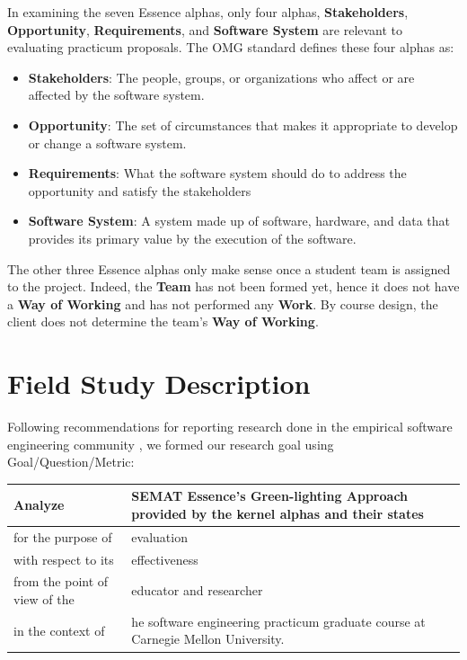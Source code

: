 \documentclass[conference]{IEEEtran}
\begin{document}
In examining the seven Essence alphas, only four alphas,
\textbf{Stakeholders}, \textbf{Opportunity}, \textbf{Requirements}, and \textbf{Software System} are relevant to evaluating practicum proposals. The OMG standard defines these four alphas as: \cite{OMGStandard}

\begin{itemize}
\itemsep1pt\parskip0pt
\item
  \textbf{Stakeholders}: The people, groups, or organizations who affect or
  are affected by the software system.
\item
  \textbf{Opportunity}: The set of circumstances that makes it appropriate to
  develop or change a software system.
\item
  \textbf{Requirements}: What the software system should do to address the
  opportunity and satisfy the stakeholders
\item
  \textbf{Software System}: A system made up of software, hardware, and data
  that provides its primary value by the execution of the software.
\end{itemize}

The other three Essence alphas only make sense once a student team is
assigned to the project. Indeed, the \textbf{Team} has not been formed yet,
hence it does not have a \textbf{Way of Working} and has not performed any
\textbf{Work}. By course design, the client does not determine the team's
\textbf{Way of Working}.


\section{Field Study Description}
\label{Field Study Description}

Following recommendations for reporting research done in the empirical
software engineering community
\cite{GQM, Shaw}, we formed our
research goal using Goal/Question/Metric:
\cite{GQM}

\begin{table}[h]
\centering
\begin{tabular}{|p{1.00in}|p{2.10in}|}
\hline
Analyze & SEMAT Essence’s Green-lighting Approach provided by the kernel alphas and their states \\ \hline
for the purpose of & evaluation \\ \hline
with respect to its & effectiveness \\ \hline
from the point of view of the & educator and researcher \\ \hline
in the context of  & he software engineering practicum graduate course at Carnegie Mellon University. \\
\hline
\end{tabular}
\end{table}
\end{document}
